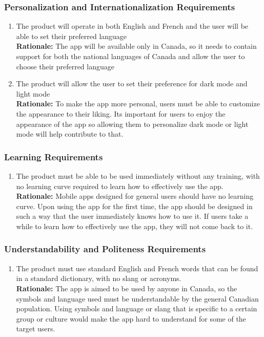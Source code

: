\documentclass[]{article}
\begin{document}
\subsubsection{Personalization and Internationalization Requirements}
\label{ssub:personalization_and_internationalization_requirements}
\begin{enumerate}[{UH-PI}1. ]
	\item The product will operate in both English and French and the user will be able to set their preferred language \\
	{\bf Rationale:} The app will be available only in Canada, so it needs to contain support for both the national languages of Canada and allow the user to choose their preferred language
	\item The product will allow the user to set their preference for dark mode and light mode \\
	{\bf Rationale:} To make the app more personal, users must be able to customize the appearance to their liking. Its important for users to enjoy the appearance of the app so allowing them to personalize dark mode or light mode will help contribute to that.
\end{enumerate}

\subsubsection{Learning Requirements}
\label{ssub:learning_requirements}
\begin{enumerate}[{UH-L}1. ]
	\item The product must be able to be used immediately without any training, with no learning curve required to learn how to effectively use the app. \\
	{\bf Rationale:} Mobile apps designed for general users should have no learning curve. Upon using the app for the first time, the app should be designed in such a way that the user immediately knows how to use it. If users take a while to learn how to effectively use the app, they will not come back to it.
\end{enumerate}

\subsubsection{Understandability and Politeness Requirements}
\label{ssub:understandability_and_politeness_requirements}
\begin{enumerate}[{UH-UP}1. ]
	\item The product must use standard English and French words that can be found in a standard dictionary, with no slang or acronyms. \\
	{\bf Rationale:} The app is aimed to be used by anyone in Canada, so the symbols and language used must be understandable by the general Canadian population. Using symbols and language or slang that is specific to a certain group or culture would make the app hard to understand for some of the target users.
\end{enumerate}
\end{document}
